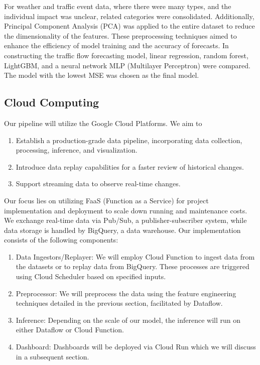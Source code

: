 For weather and traffic event data, where there were many types, and the individual impact was unclear, related categories were consolidated. Additionally, Principal Component Analysis (PCA) was applied to the entire dataset to reduce the dimensionality of the features. These preprocessing techniques aimed to enhance the efficiency of model training and the accuracy of forecasts.
In constructing the traffic flow forecasting model, linear regression, random forest, LightGBM, and a neural network MLP (Multilayer Perceptron) were compared. The model with the lowest MSE was chosen as the final model.

\subsection{Cloud Computing}
Our pipeline will utilize the Google Cloud Platforms. We aim to 
\begin{enumerate}
    \item Establish a production-grade data pipeline, incorporating data collection, processing, inference, and visualization.
    \item Introduce data replay capabilities for a faster review of historical changes.
    \item Support streaming data to observe real-time changes.
\end{enumerate}

Our focus lies on utilizing FaaS (Function as a Service) for project implementation and deployment to scale down running and maintenance costs. We exchange real-time data via Pub/Sub, a publisher-subscriber system, while data storage is handled by BigQuery, a data warehouse. Our implementation consists of the following components:

\begin{enumerate}
    \item Data Ingestors/Replayer: We will employ Cloud Function to ingest data from the datasets or to replay data from BigQuery. These processes are triggered using Cloud Scheduler based on specified inputs.
    \item Preprocessor: We will preprocess the data using the feature engineering techniques detailed in the previous section, facilitated by Dataflow.
    \item Inference: Depending on the scale of our model, the inference will run on either Dataflow or Cloud Function.
    \item Dashboard: Dashboards will be deployed via Cloud Run which we will discuss in a subsequent section.
\end{enumerate}

